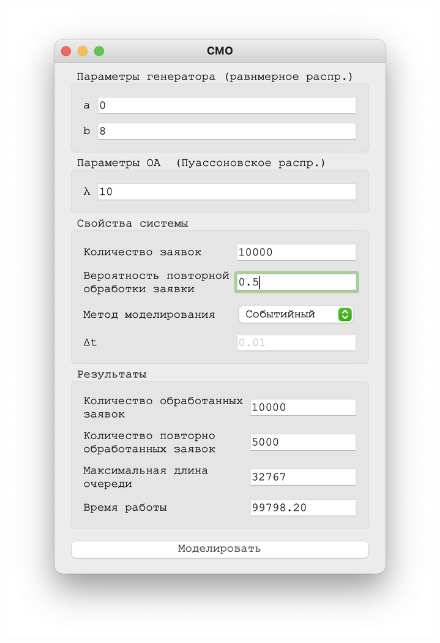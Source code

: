  \begin{figure}[!htb]
    \begin{minipage}{0.55\textwidth}
      \centering
      \includegraphics[width=1\linewidth]{10-50-s}
    \end{minipage}\hfill
    \begin{minipage}{0.55\textwidth}
      \centering

\end{minipage}
\end{figure}
